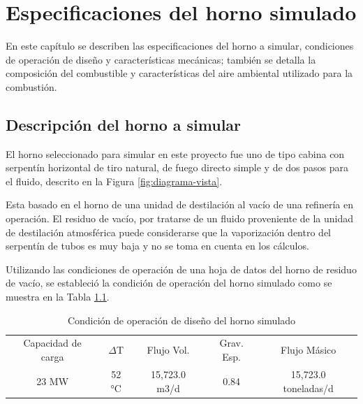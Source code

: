 \chapter{Especificaciones del horno simulado}

\par En este capítulo se describen las especificaciones del horno a simular, condiciones de operación de diseño y características mecánicas; también se detalla la composición del combustible y características del aire ambiental utilizado para la combustión.

\section{Descripción del horno a simular}
\par El horno seleccionado para simular en este proyecto fue uno de tipo cabina con serpentín horizontal de tiro natural, de fuego directo simple y de dos pasos para el fluido, descrito en la Figura \ref{fig:diagrama-vista}.
\par Esta basado en el horno de una unidad de destilación al vacío de una refinería en operación. El residuo de vacío, por tratarse de un fluido proveniente de la unidad de destilación atmosférica puede considerarse que la vaporización dentro del serpentín de tubos es muy baja y no se toma en cuenta en los cálculos.
\par Utilizando las condiciones de operación de una hoja de datos del horno de residuo de vacío, se estableció la condición de operación del horno simulado como se muestra en la Tabla \ref{tbl:capacidad}.
\begin{table}[H]\begin{center}
\caption[Condición de operación de diseño del horno]{Condición de operación de diseño del horno simulado}
\label{tbl:capacidad}\begin{tabular}{c|c|c|c|c}
Capacidad de carga& $\Delta$T& Flujo Vol.   & Grav. Esp.& Flujo Másico\\
23 MW 	          & 52 °C    & 15,723.0 m3/d& 0.84      & 15,723.0 toneladas/d
\end{tabular}\end{center}\end{table}
